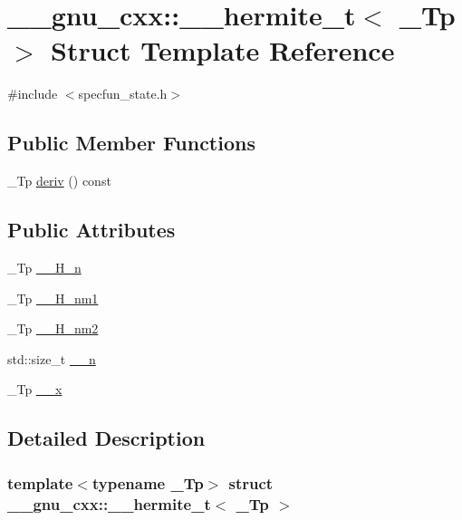 \hypertarget{struct____gnu__cxx_1_1____hermite__t}{}\section{\+\_\+\+\_\+gnu\+\_\+cxx\+:\+:\+\_\+\+\_\+hermite\+\_\+t$<$ \+\_\+\+Tp $>$ Struct Template Reference}
\label{struct____gnu__cxx_1_1____hermite__t}


{\ttfamily \#include $<$specfun\+\_\+state.\+h$>$}

\subsection*{Public Member Functions}
\begin{DoxyCompactItemize}
\item 
\+\_\+\+Tp \hyperlink{struct____gnu__cxx_1_1____hermite__t_aa92fd4096ca98fedad08b95187bb7a34}{deriv} () const
\end{DoxyCompactItemize}
\subsection*{Public Attributes}
\begin{DoxyCompactItemize}
\item 
\+\_\+\+Tp \hyperlink{struct____gnu__cxx_1_1____hermite__t_a98a85357be4cb36000df3e552c197408}{\+\_\+\+\_\+\+H\+\_\+n}
\item 
\+\_\+\+Tp \hyperlink{struct____gnu__cxx_1_1____hermite__t_af2c7ee1e0f02c0debd4fbe2b5c59673e}{\+\_\+\+\_\+\+H\+\_\+nm1}
\item 
\+\_\+\+Tp \hyperlink{struct____gnu__cxx_1_1____hermite__t_a7b35cb679cb110703a0089c726b2a1ab}{\+\_\+\+\_\+\+H\+\_\+nm2}
\item 
std\+::size\+\_\+t \hyperlink{struct____gnu__cxx_1_1____hermite__t_a77e4819d1c23fa599d00d949f8b4f6fe}{\+\_\+\+\_\+n}
\item 
\+\_\+\+Tp \hyperlink{struct____gnu__cxx_1_1____hermite__t_a0d0d266ed927f890a51f9a5ef635a5d3}{\+\_\+\+\_\+x}
\end{DoxyCompactItemize}


\subsection{Detailed Description}
\subsubsection*{template$<$typename \+\_\+\+Tp$>$\newline
struct \+\_\+\+\_\+gnu\+\_\+cxx\+::\+\_\+\+\_\+hermite\+\_\+t$<$ \+\_\+\+Tp $>$}

